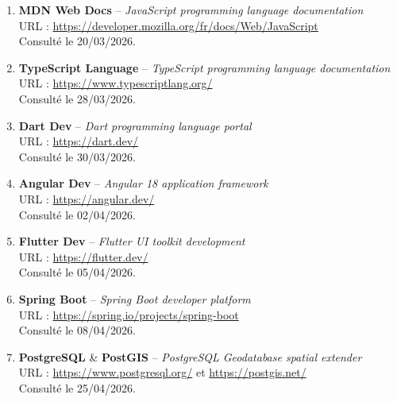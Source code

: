 \begin{enumerate}
    \item \textbf{MDN Web Docs} -- \textit{JavaScript programming language documentation} \\
    URL : \href{https://developer.mozilla.org/fr/docs/Web/JavaScript}{https://developer.mozilla.org/fr/docs/Web/JavaScript} \\
    Consulté le 20/03/2026.
    
    \item \textbf{TypeScript Language} -- \textit{TypeScript programming language documentation} \\
    URL : \href{https://www.typescriptlang.org/}{https://www.typescriptlang.org/} \\
    Consulté le 28/03/2026.
    
    \item \textbf{Dart Dev} -- \textit{Dart programming language portal} \\
    URL : \href{https://dart.dev/}{https://dart.dev/} \\
    Consulté le 30/03/2026.
    
    \item \textbf{Angular Dev} -- \textit{Angular 18 application framework} \\
    URL : \href{https://angular.dev/}{https://angular.dev/} \\
    Consulté le 02/04/2026.
    
    \item \textbf{Flutter Dev} -- \textit{Flutter UI toolkit development} \\
    URL : \href{https://flutter.dev/}{https://flutter.dev/} \\
    Consulté le 05/04/2026.
    
    \item \textbf{Spring Boot} -- \textit{Spring Boot developer platform} \\
    URL : \href{https://spring.io/projects/spring-boot}{https://spring.io/projects/spring-boot} \\
    Consulté le 08/04/2026.
    
    \item \textbf{PostgreSQL} \& \textbf{PostGIS} -- \textit{PostgreSQL Geodatabase spatial extender} \\
    URL : \href{https://www.postgresql.org/}{https://www.postgresql.org/} et \href{https://postgis.net/}{https://postgis.net/} \\
    Consulté le 25/04/2026.
\end{enumerate}
